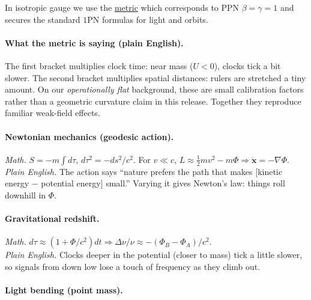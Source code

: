 \documentclass[
]{article}
\begin{document}
In isotropic gauge we use the
\hyperref[from-metric-to-the-h_0-ansatz-one-page-derivation]{metric}
which corresponds to PPN \(\beta = \gamma = 1\) and secures the standard
\(1\)PN formulas for light and orbits.

\paragraph{What the metric is saying (plain
English).}\label{what-the-metric-is-saying-plain-english.}

The first bracket multiplies clock time: near mass (\(U < 0\)), clocks
tick a bit slower. The second bracket multiplies spatial distances:
rulers are stretched a tiny amount. On our \emph{operationally flat}
background, these are small calibration factors rather than a geometric
curvature claim in this release. Together they reproduce familiar
weak-field effects.

\paragraph{Newtonian mechanics (geodesic
action).}\label{newtonian-mechanics-geodesic-action.}

\emph{Math.} \(S = - m\int d\tau\), \(d\tau^{2} = - ds^{2}/c^{2}\). For
\(v \ll c\),
\(L \approx \frac{1}{2}mv^{2} - m\Phi \Rightarrow \ddot{\mathbf{x}} = - \nabla\Phi\).\\
\emph{Plain English.} The action says ``nature prefers the path that
makes {[}kinetic energy \(-\) potential energy{]} small.'' Varying it
gives Newton's law: things roll downhill in \(\Phi\).

\paragraph{Gravitational redshift.}\label{gravitational-redshift.}

\emph{Math.}
\(d\tau \approx (1 + \Phi/c^{2})dt \Rightarrow \Delta\nu/\nu \approx - (\Phi_{B} - \Phi_{A})/c^{2}\).\\
\emph{Plain English.} Clocks deeper in the potential (closer to mass)
tick a little slower, so signals from down low lose a touch of frequency
as they climb out.

\paragraph{Light bending (point mass).}\label{light-bending-point-mass.}
\end{document}
